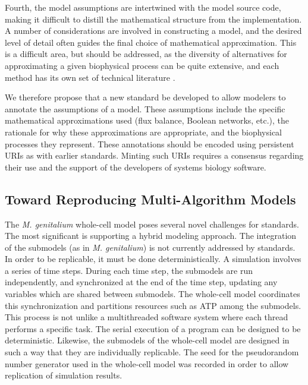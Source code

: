 \documentclass[journal,transmag,twoside]{IEEEtran}
\begin{document}
Fourth, the model assumptions are intertwined with the model source code, making it difficult
to distill the mathematical structure from the implementation.
A number of considerations are involved in constructing a model, and the desired level of detail
often guides the final choice of mathematical approximation.
This is a difficult area, but should be addressed, as the diversity of alternatives for approximating
a given biophysical process can be quite extensive, and each method has its own set of
technical literature \cite{gunawardena2014models}.

We therefore propose that a new standard be developed to allow modelers to annotate the assumptions
of a model.
These assumptions include the specific mathematical approximations used (flux balance, Boolean networks, etc.),
the rationale for why these approximations are appropriate, and the biophysical processes they represent.
These annotations should be encoded using persistent URIs as with earlier standards.
Minting such URIs requires a consensus regarding their use and the support of the developers of
systems biology software.

\subsection{Toward Reproducing Multi-Algorithm Models}

The \textit{M. genitalium} whole-cell model poses several novel challenges for standards.
The most significant is supporting a hybrid modeling approach.
The integration of the submodels (as in \textit{M. genitalium}) is not currently
addressed by standards. In order to be replicable, it must be done deterministically.
A simulation involves a series of time steps. During each time step, the
submodels are run independently,
and synchronized at the end of the time step, updating any variables
which are shared between submodels.
The whole-cell model coordinates this synchronization and partitions resources such as ATP
among the submodels.
This process is not unlike a multithreaded software system where each thread performs
a specific task. The serial execution of a program can be designed to be deterministic.
Likewise, the submodels of the whole-cell model are designed in such a way that
they are individually replicable. The seed for the pseudorandom number generator
used in the whole-cell model was recorded in order to allow replication of simulation results.
\end{document}
